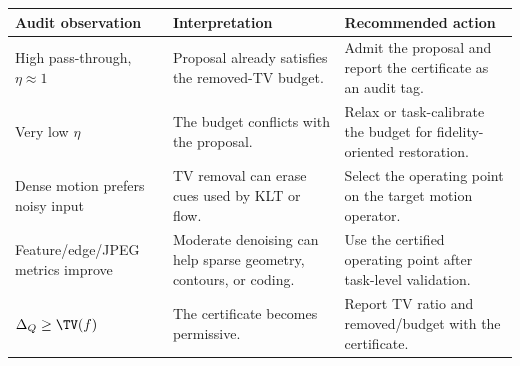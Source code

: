\begin{tabular}{p{}p{}p{}}
\toprule
Audit observation & Interpretation & Recommended action \\
\midrule
High pass-through, $\eta\approx1$ & Proposal already satisfies the removed-TV budget. & Admit the proposal and report the certificate as an audit tag. \\
Very low $\eta$ & The budget conflicts with the proposal. & Relax or task-calibrate the budget for fidelity-oriented restoration. \\
Dense motion prefers noisy input & TV removal can erase cues used by KLT or flow. & Select the operating point on the target motion operator. \\
Feature/edge/JPEG metrics improve & Moderate denoising can help sparse geometry, contours, or coding. & Use the certified operating point after task-level validation. \\
$\Delta_Q\ge\TV(f)$ & The certificate becomes permissive. & Report TV ratio and removed/budget with the certificate. \\
\bottomrule
\end{tabular}
